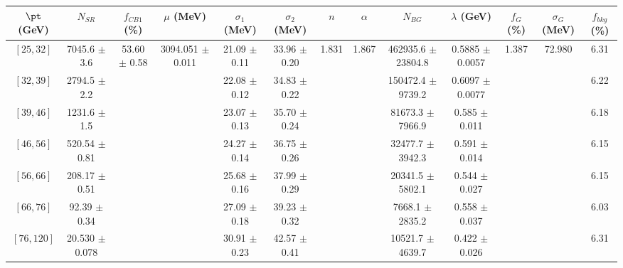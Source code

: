 \begin{tabular}{c||c|c|c|c|c|c|c|c|c|c|c||c}
$\pt$ (GeV) & $N_{SR}$ & $f_{CB1}$ (\%) & $\mu$ (MeV) & $\sigma_1$ (MeV) & $\sigma_2$ (MeV) & $n$ & $\alpha$ & $N_{BG}$ & $\lambda$ (GeV) & $f_G$ (\%) & $\sigma_G$ (MeV) & $f_{bkg}$ (\%) \\
\hline
$[25, 32]$ & 7045.6 $\pm$ 3.6 & \multirow{7}{*}{53.60 $\pm$ 0.58} & \multirow{7}{*}{3094.051 $\pm$ 0.011} & 21.09 $\pm$ 0.11 & 33.96 $\pm$ 0.20 & \multirow{7}{*}{1.831} & \multirow{7}{*}{1.867} & 462935.6 $\pm$ 23804.8 & 0.5885 $\pm$ 0.0057 & \multirow{7}{*}{1.387} & \multirow{7}{*}{72.980} & 6.31\\
$[32, 39]$ & 2794.5 $\pm$ 2.2 &  &  & 22.08 $\pm$ 0.12 & 34.83 $\pm$ 0.22 &  &  & 150472.4 $\pm$ 9739.2 & 0.6097 $\pm$ 0.0077 &  &  & 6.22\\
$[39, 46]$ & 1231.6 $\pm$ 1.5 &  &  & 23.07 $\pm$ 0.13 & 35.70 $\pm$ 0.24 &  &  & 81673.3 $\pm$ 7966.9 & 0.585 $\pm$ 0.011 &  &  & 6.18\\
$[46, 56]$ & 520.54 $\pm$ 0.81 &  &  & 24.27 $\pm$ 0.14 & 36.75 $\pm$ 0.26 &  &  & 32477.7 $\pm$ 3942.3 & 0.591 $\pm$ 0.014 &  &  & 6.15\\
$[56, 66]$ & 208.17 $\pm$ 0.51 &  &  & 25.68 $\pm$ 0.16 & 37.99 $\pm$ 0.29 &  &  & 20341.5 $\pm$ 5802.1 & 0.544 $\pm$ 0.027 &  &  & 6.15\\
$[66, 76]$ & 92.39 $\pm$ 0.34 &  &  & 27.09 $\pm$ 0.18 & 39.23 $\pm$ 0.32 &  &  & 7668.1 $\pm$ 2835.2 & 0.558 $\pm$ 0.037 &  &  & 6.03\\
$[76, 120]$ & 20.530 $\pm$ 0.078 &  &  & 30.91 $\pm$ 0.23 & 42.57 $\pm$ 0.41 &  &  & 10521.7 $\pm$ 4639.7 & 0.422 $\pm$ 0.026 &  &  & 6.31\\
\end{tabular}

